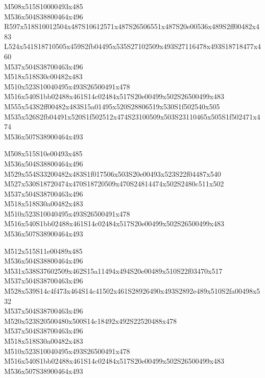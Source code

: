 \documentclass{article}
\begin{document}
\begin{multicols}{5}
\begin{center}

M508x515S10000493x485 %
\\M536x504S38800464x496 %
\\R597x518S10012504x487S10612571x487S26506551x487S20e00536x489S2ff00482x483 %
\\L524x541S18710505x459S2fb04495x535S27102509x493S27116478x493S18718477x460 %
\\M537x504S38700463x496 %
\\M518x518S30c00482x483 %
\\M510x523S10040495x493S26500491x478 %
\\M516x540S1bb02488x461S14c02484x517S20e00499x502S26500499x483 %
\\M555x543S2ff00482x483S15a01495x520S28806519x530S1f502540x505 %
\\M535x526S2fb04491x520S1f502512x474S23100509x503S23110465x505S1f502471x474 %
\\M536x507S38900464x493 %
\vfil
\columnbreak

M508x515S10e00493x485 %
\\M536x504S38800464x496 %
\\M529x554S33200482x483S1f017506x503S20e00493x523S22f04487x540 %
\\M527x530S18720474x470S18720509x470S24814474x502S2480c511x502 %
\\M537x504S38700463x496 %
\\M518x518S30a00482x483 %
\\M510x523S10040495x493S26500491x478 %
\\M516x540S1bb02488x461S14c02484x517S20e00499x502S26500499x483 %
\\M536x507S38900464x493 %
\vfil
\columnbreak

M512x515S11e00489x485 %
\\M536x504S38800464x496 %
\\M531x538S37602509x462S15a11494x494S20e00489x510S22f03470x517 %
\\M537x504S38700463x496 %
\\M528x539S14c4f473x464S14c41502x461S28926490x493S2892e489x510S2fa00498x532 %
\\M537x504S38700463x496 %
\\M520x523S20500480x500S14c18492x492S22520488x478 %
\\M537x504S38700463x496 %
\\M518x518S30a00482x483 %
\\M510x523S10040495x493S26500491x478 %
\\M516x540S1bb02488x461S14c02484x517S20e00499x502S26500499x483 %
\\M536x507S38900464x493 %
\vfil
\columnbreak


\end{center}
\end{multicols}
\end{document}
